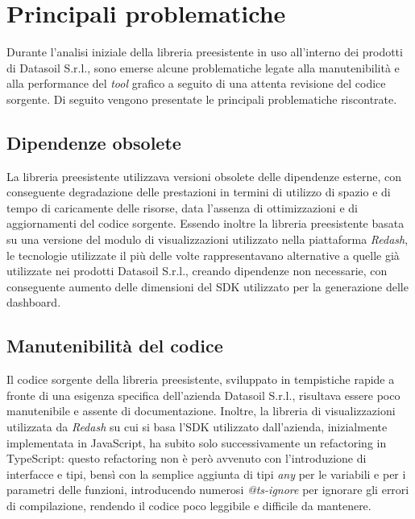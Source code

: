 \section{Principali problematiche}
Durante l'analisi iniziale della libreria preesistente in uso all'interno dei prodotti di Datasoil S.r.l., sono emerse alcune problematiche
legate alla manutenibilità e alla performance del \textit{tool} grafico a seguito di una attenta revisione del codice sorgente. \newline
Di seguito vengono presentate le principali problematiche riscontrate.

\subsection{Dipendenze obsolete}
La libreria preesistente utilizzava versioni obsolete delle dipendenze esterne, con conseguente degradazione delle prestazioni in termini
di utilizzo di spazio e di tempo di caricamente delle risorse, data l'assenza di ottimizzazioni e di aggiornamenti del codice sorgente. \newline
Essendo inoltre la libreria preesistente basata su una versione del modulo di visualizzazioni utilizzato nella piattaforma \textit{Redash},
le tecnologie utilizzate il più delle volte rappresentavano alternative a quelle già utilizzate nei prodotti Datasoil S.r.l., creando dipendenze
non necessarie, con conseguente aumento delle dimensioni del SDK utilizzato per la generazione delle dashboard.

\subsection{Manutenibilità del codice}
Il codice sorgente della libreria preesistente, sviluppato in tempistiche rapide a fronte di una esigenza specifica dell'azienda Datasoil S.r.l.,
risultava essere poco manutenibile e assente di documentazione. \newline
Inoltre, la libreria di visualizzazioni utilizzata da \textit{Redash} su cui si basa l'SDK utilizzato dall'azienda, inizialmente implementata in JavaScript,
ha subito solo successivamente un refactoring in TypeScript: questo refactoring non è però avvenuto con l'introduzione di interfacce e tipi, bensì con la semplice aggiunta
di tipi \textit{any} per le variabili e per i parametri delle funzioni, introducendo numerosi \textit{@ts-ignore} per ignorare gli errori di compilazione, rendendo il codice
poco leggibile e difficile da mantenere.


